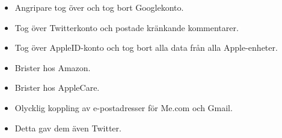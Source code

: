 \begin{frame}
  \begin{example}
    \begin{itemize}
      \item Angripare tog över och tog bort Googlekonto.
      \item Tog över Twitterkonto och postade kränkande kommentarer.
      \item Tog över AppleID-konto och tog bort alla data från alla 
        Apple-enheter.
    \end{itemize}
  \end{example}
\end{frame}

\begin{frame}
  \begin{example}
    \begin{itemize}
      \item Brister hos Amazon.
      \item Brister hos AppleCare.
      \item Olycklig koppling av e-postadresser för Me.com och Gmail.
      \item Detta gav dem även Twitter.
    \end{itemize}
  \end{example}
\end{frame}



\begin{frame}[allowframebreaks]
	\small
  \printbibliography
\end{frame}

